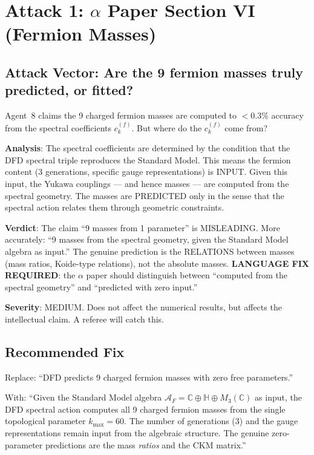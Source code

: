 \documentclass[11pt,a4paper]{article}
\begin{document}
\section{Attack 1: $\alpha$ Paper Section VI (Fermion Masses)}

\subsection{Attack Vector: Are the 9 fermion masses truly predicted, or fitted?}

Agent~8 claims the 9 charged fermion masses are computed to $< 0.3\%$ accuracy from the spectral coefficients $c_k^{(f)}$. But where do the $c_k^{(f)}$ come from?

\textbf{Analysis}: The spectral coefficients are determined by the condition that the DFD spectral triple reproduces the Standard Model. This means the fermion content (3 generations, specific gauge representations) is INPUT. Given this input, the Yukawa couplings --- and hence masses --- are computed from the spectral geometry. The masses are PREDICTED only in the sense that the spectral action relates them through geometric constraints.

\textbf{Verdict}: The claim ``9 masses from 1 parameter'' is MISLEADING. More accurately: ``9 masses from the spectral geometry, given the Standard Model algebra as input.'' The genuine prediction is the RELATIONS between masses (mass ratios, Koide-type relations), not the absolute masses. \textbf{LANGUAGE FIX REQUIRED}: the $\alpha$ paper should distinguish between ``computed from the spectral geometry'' and ``predicted with zero input.''

\textbf{Severity}: MEDIUM. Does not affect the numerical results, but affects the intellectual claim. A referee will catch this.

\subsection{Recommended Fix}

Replace: ``DFD predicts 9 charged fermion masses with zero free parameters.''

With: ``Given the Standard Model algebra $\mathcal{A}_F = \mathbb{C} \oplus \mathbb{H} \oplus M_3(\mathbb{C})$ as input, the DFD spectral action computes all 9 charged fermion masses from the single topological parameter $k_{\max} = 60$. The number of generations (3) and the gauge representations remain input from the algebraic structure. The genuine zero-parameter predictions are the mass \textit{ratios} and the CKM matrix.''
\end{document}
